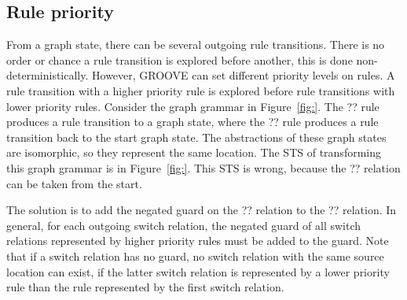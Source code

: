 \subsection{Rule priority}
From a graph state, there can be several outgoing rule transitions. There is no order or chance a rule transition is explored before another, this is done non-deterministically. However, GROOVE can set different priority levels on rules. A rule transition with a higher priority rule is explored before rule transitions with lower priority rules. Consider the graph grammar in Figure~\ref{fig:}. The ?? rule produces a rule transition to a graph state, where the ?? rule produces a rule transition back to the start graph state. The abstractions of these graph states are isomorphic, so they represent the same location. The STS of transforming this graph grammar is in Figure~\ref{fig:}. This STS is wrong, because the ?? relation can be taken from the start. 

The solution is to add the negated guard on the ?? relation to the ?? relation. In general, for each outgoing switch relation, the negated guard of all switch relations represented by higher priority rules must be added to the guard. Note that if a switch relation has no guard, no switch relation with the same source location can exist, if the latter switch relation is represented by a lower priority rule than the rule represented by the first switch relation.
